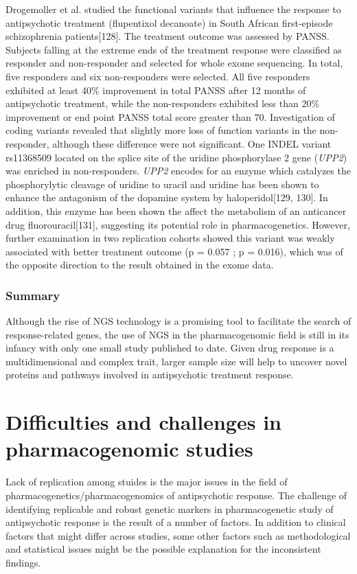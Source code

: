 \documentclass[12pt]{report}
\newcommand{\gene}[1]{\textit{#1}}
\begin{document}
				Drogemoller et al. studied the functional variants that influence the response to antipsychotic treatment (flupentixol decanoate) in South African first-episode schizophrenia patients[128].
				The treatment outcome was assessed by PANSS. 
				Subjects falling at the extreme ends of the treatment response were classified as responder and non-responder and selected for whole exome sequencing. 
				In total, five responders and six non-responders were selected. 
				All five responders exhibited at least 40$\%$ improvement in total PANSS after 12 months of antipsychotic treatment, while the non-responders exhibited less than 20$\%$ improvement or end point PANSS total score greater than 70. 
				Investigation of coding variants revealed that slightly more loss of function variants in the non-responder, although these difference were not significant. 
				One INDEL variant rs11368509 located on the splice site of the uridine phosphorylase 2 gene (\gene{UPP2}) was enriched in non-responders. 
				\gene{UPP2} encodes for an enzyme which catalyzes the phosphorylytic cleavage of uridine to uracil and uridine has been shown to enhance the antagonism of the dopamine system by haloperidol[129, 130]. 
				In addition, this enzyme has been shown the affect the metabolism of an anticancer drug fluorouracil[131], suggesting its potential role in pharmacogenetics. 
				However, further examination in two replication cohorts showed this variant was weakly associated with better treatment outcome (p = 0.057 ; p = 0.016), which was of the opposite direction to the result obtained in the exome data. 
				
			\subsubsection{Summary}
				Although the rise of NGS technology is a promising tool to facilitate the search of response-related genes, the use of NGS in the pharmacogenomic field is still in its infancy with only one small study published to date. 
				Given drug response is a multidimensional and complex trait, larger sample size will help to uncover novel proteins and pathways involved in antipsychotic treatment response. 
			\section{Difficulties and challenges in pharmacogenomic studies}
				Lack of replication among stuides is the major issues in the field of pharmacogenetics/pharmacogenomics of antipsychotic response. 
				The challenge of identifying replicable and robust genetic markers in pharmacogenetic study of antipsychotic response is the result of a number of factors. In addition to clinical factors that might differ across studies, some other factors such as methodological and statistical issues might be the possible explanation for the inconsistent findings.  
\end{document}
